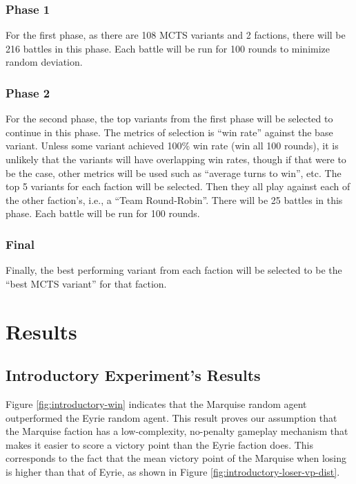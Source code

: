 \subsubsection{Phase 1}
For the first phase, as there are 108 MCTS variants and 2 factions, there will be 216 battles in this phase. Each battle will be run for 100 rounds to minimize random deviation.

\subsubsection{Phase 2}
For the second phase, the top variants from the first phase will be selected to continue in this phase. The metrics of selection is ``win rate'' against the base variant. Unless some variant achieved 100\% win rate (win all 100 rounds), it is unlikely that the variants will have overlapping win rates, though if that were to be the case, other metrics will be used such as ``average turns to win'', etc. The top 5 variants for each faction will be selected. Then they all play against each of the other faction's, i.e., a ``Team Round-Robin''. There will be 25 battles in this phase. Each battle will be run for 100 rounds.

\subsubsection{Final}
Finally, the best performing variant from each faction will be selected to be the ``best MCTS variant'' for that faction.



\section{Results}

\subsection{Introductory Experiment's Results}

Figure \ref{fig:introductory-win} indicates that the Marquise random agent outperformed the Eyrie random agent. This result proves our assumption that the Marquise faction has a low-complexity, no-penalty gameplay mechanism that makes it easier to score a victory point than the Eyrie faction does. This corresponds to the fact that the mean victory point of the Marquise when losing is higher than that of Eyrie, as shown in Figure \ref{fig:introductory-loser-vp-dist}.

